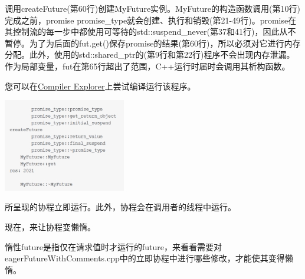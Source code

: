 调用createFuture(第60行)创建MyFuture实例。MyFuture的构造函数调用(第10行)完成之前，promise promise\_type就会创建、执行和销毁(第21-49行)。promise在其控制流的每一步中都使用可等待的std::suspend\_never(第37和41行)，因此从不暂停。为了为后面的fut.get()保存promise的结果(第60行)，所以必须对它进行内存分配。此外，使用的std::shared\_ptr的(第9行和第22行)程序不会出现内存泄漏。作为局部变量，fut在第65行超出了范围，C++运行时届时会调用其析构函数。

您可以在\href{https://godbolt.org/z/Y9naEx}{Compiler Explorer}上尝试编译运行该程序。

\begin{center}
\includegraphics[width=0.4\textwidth]{content/3/chapter7/images/8.png}\\
\end{center}

所呈现的协程立即运行。此外，协程会在调用者的线程中运行。

现在，来让协程变懒惰。


惰性future是指仅在请求值时才运行的future，来看看需要对eagerFutureWithComments.cpp中的立即协程中进行哪些修改，才能使其变得懒惰。

